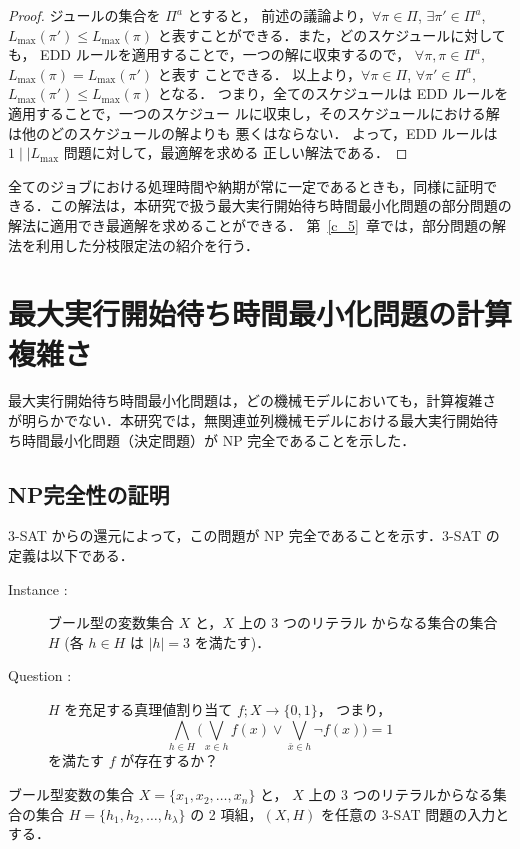 \documentclass[12pt]{optlab-bachelor}
\begin{document}
\begin{proof}
  ジュールの集合を $\Pi^a$ とすると，
  前述の議論より，$\forall \pi \in \Pi$, $\exists \pi' \in \Pi^a$, $L_{\max}(\pi') \le
  L_{\max}(\pi)$ と表すことができる．また，どのスケジュールに対しても，
  EDD ルールを適用することで，一つの解に収束するので，
  $\forall \pi, \pi \in \Pi^a$, $L_{\max}(\pi) = L_{\max}(\pi')$ と表す
  ことできる．
  以上より，$\forall \pi \in \Pi$, $\forall
  \pi' \in \Pi^a$, $L_{\max}(\pi') \le L_{\max}(\pi)$ となる．
  つまり，全てのスケジュールは EDD ルールを適用することで，一つのスケジュー
  ルに収束し，そのスケジュールにおける解は他のどのスケジュールの解よりも
  悪くはならない．
  よって，EDD ルールは $1\mid \mid L_{\max}$ 問題に対して，最適解を求める
  正しい解法である．
\end{proof}

全てのジョブにおける処理時間や納期が常に一定であるときも，同様に証明で
きる．この解法は，本研究で扱う最大実行開始待ち時間最小化問題の部分問題の解法に適用でき最適解を求めることができる．
第~\ref{c_5}~章では，部分問題の解法を利用した分枝限定法の紹介を行う．

\chapter{最大実行開始待ち時間最小化問題の計算複雑さ}\label{c_4}
最大実行開始待ち時間最小化問題は，どの機械モデルにおいても，計算複雑さ
が明らかでない．本研究では，無関連並列機械モデルにおける最大実行開始待
ち時間最小化問題（決定問題）が NP 完全であることを示した．
\section{NP完全性の証明}
3-SAT からの還元によって，この問題が NP  完全であることを示す．3-SAT
の定義は以下である．

\begin{description}
  \item[Instance : ] ブール型の変数集合 $X$ と，$X$ 上の 3 つのリテラル
  からなる集合の集合 $H$ (各 $h \in H$ は $|h| = 3$ を満たす)．
  \item[Question : ] $H$ を充足する真理値割り当て $f ; X \to \{0,1\}$，
  つまり，
  $$\displaystyle \bigwedge_{h \in H} \bigg(\bigvee_{x \in h}f(x) \lor
  \bigvee_{\bar x \in h}\lnot f(x) \bigg) = 1$$
  を満たす $f$ が存在するか？
\end{description}

ブール型変数の集合 $X =\{x_1, x_2,\ldots ,x_n\}$ と， $X$ 上の 3 つのリテラルからなる集合の集合 $H =\{h_1, h_2,\ldots ,h_{\lambda}\}$ の 2 項組，$(X,H)$ を任意の 3-SAT 問題の入力とする．
\end{document}
